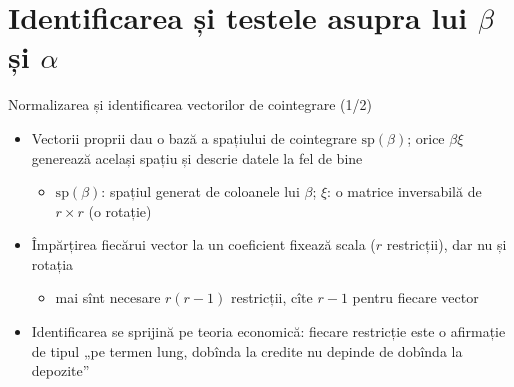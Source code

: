 \section{Identificarea și testele asupra lui $\beta$ și $\alpha$}

\begin{frame}{Normalizarea și identificarea vectorilor de cointegrare (1/2)}
\itemsize{\small}
\begin{itemize}
    \item Vectorii proprii dau o bază a spațiului de cointegrare $\mathrm{sp}(\beta)$; orice $\beta\xi$ generează același spațiu și descrie datele la fel de bine
    \begin{itemize}
        \item $\mathrm{sp}(\beta)$: spațiul generat de coloanele lui $\beta$; $\xi$: o matrice inversabilă de $r\times r$ (o rotație)
    \end{itemize}
    \item Împărțirea fiecărui vector la un coeficient fixează scala ($r$ restricții), dar nu și rotația
    \begin{itemize}
        \item mai sînt necesare $r(r - 1)$ restricții, cîte $r - 1$ pentru fiecare vector
    \end{itemize}
    \item Identificarea se sprijină pe teoria economică: fiecare restricție este o afirmație de tipul „pe termen lung, dobînda la credite nu depinde de dobînda la depozite”
\end{itemize}
\end{frame}

